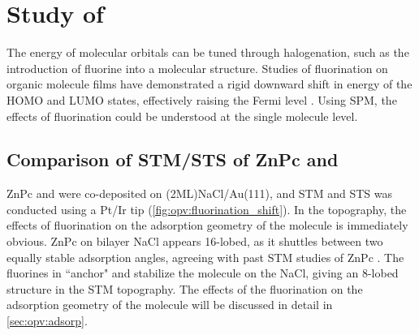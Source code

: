 








\section{Study of }

The energy of molecular orbitals can be tuned through halogenation, such as the introduction of fluorine into a molecular structure. Studies of fluorination on organic molecule films have demonstrated a rigid downward shift in energy of the HOMO and LUMO states, effectively raising the Fermi level \citep{schwarze2016band,warren2019controlling}. Using \ac{SPM}, the effects of fluorination could be understood at the single molecule level. 

\subsection{Comparison of STM/STS of ZnPc and }

ZnPc and  were co-deposited on (2ML)NaCl/Au(111), and STM and STS was conducted using a Pt/Ir tip (\autoref{fig:opv:fluorination_shift}). In the topography, the effects of fluorination on the adsorption geometry of the molecule is immediately obvious. ZnPc on bilayer NaCl appears 16-lobed, as it shuttles between two equally stable adsorption angles, agreeing with past \ac{STM} studies of ZnPc \citep{Miwa2016, Imada2016}. The fluorines in  ``anchor" and stabilize the molecule on the NaCl, giving an 8-lobed structure in the STM topography. The effects of the fluorination on the adsorption geometry of the molecule will be discussed in detail in \autoref{sec:opv:adsorp}. 


